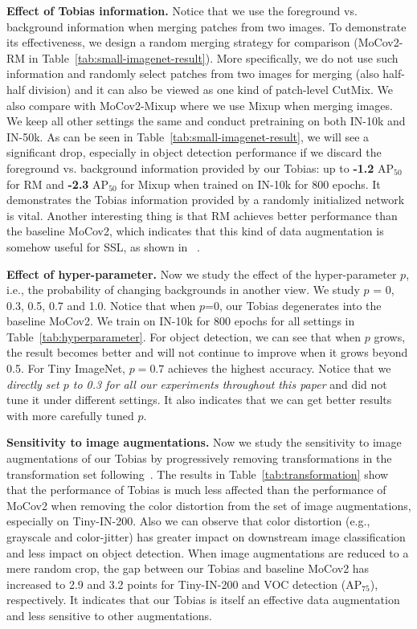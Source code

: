 \documentclass[letterpaper]{article} %
\begin{document}
\textbf{Effect of Tobias information.} Notice that we use the foreground vs. background information when merging patches from two images. To demonstrate its effectiveness, we design a random merging strategy for comparison (MoCov2-RM in Table~\ref{tab:small-imagenet-result}). More specifically, we do not use such information and randomly select patches from two images for merging (also half-half division) and it can also be viewed as one kind of patch-level CutMix. We also compare with MoCov2-Mixup where we use Mixup when merging images. We keep all other settings the same and conduct pretraining on both IN-10k and IN-50k. As can be seen in Table~\ref{tab:small-imagenet-result}, we will see a significant drop, especially in object detection performance if we discard the foreground vs. background information provided by our Tobias: up to \textbf{-1.2} $\text{AP}_{50}$ for RM and \textbf{-2.3} $\text{AP}_{50}$ for Mixup when trained on IN-10k for 800 epochs. It demonstrates the Tobias information provided by a randomly initialized network is vital. Another interesting thing is that RM achieves better performance than the baseline MoCov2, which indicates that this kind of data augmentation is somehow useful for SSL, as shown in ~\citep{unmix:shen:arxiv20}.

\textbf{Effect of hyper-parameter.} Now we study the effect of the hyper-parameter $p$, i.e., the probability of changing backgrounds in another view. We study $p$ = 0, 0.3, 0.5, 0.7 and 1.0. Notice that when $p$=0, our Tobias degenerates into the baseline MoCov2. We train on IN-10k for 800 epochs for all settings in Table~\ref{tab:hyperparameter}. For object detection, we can see that when $p$ grows, the result becomes better and will not continue to improve when it grows beyond 0.5. For Tiny ImageNet, $p=0.7$ achieves the highest accuracy. Notice that we \emph{directly set $p$ to 0.3 for all our experiments throughout this paper} and did not tune it under different settings. It also indicates that we can get better results with more carefully tuned $p$.



\textbf{Sensitivity to image augmentations.} Now we study the sensitivity to image augmentations of our Tobias by progressively removing transformations in the transformation set following~\citet{byol:grill:NIPS20}. The results in Table~\ref{tab:transformation} show that the performance of Tobias is much less affected than the performance of MoCov2 when removing the color distortion from the set of image augmentations, especially on Tiny-IN-200. Also we can observe that color distortion (e.g., grayscale and color-jitter) has greater impact on downstream image classification and less impact on object detection. When image augmentations are reduced to a mere random crop, the gap between our Tobias and baseline MoCov2 has increased to 2.9 and 3.2 points for Tiny-IN-200 and VOC detection ($\text{AP}_{75}$), respectively. It indicates that our Tobias is itself an effective data augmentation and less sensitive to other augmentations.
\end{document}

